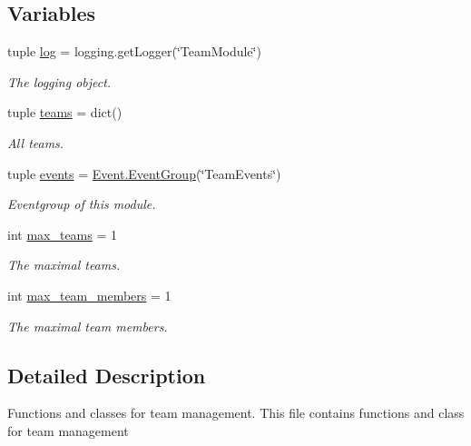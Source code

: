 \subsection*{Variables}
\begin{DoxyCompactItemize}
\item 
tuple \hyperlink{namespace_team_aeda58b8cc54d371e3187f3c9af31f8cf}{log} = logging.getLogger(\char`\"{}TeamModule\char`\"{})
\begin{DoxyCompactList}\small\item\em The logging object. \item\end{DoxyCompactList}\item 
tuple \hyperlink{namespace_team_a6e402bba79c6732149986dc7571493f2}{teams} = dict()
\begin{DoxyCompactList}\small\item\em All teams. \item\end{DoxyCompactList}\item 
tuple \hyperlink{namespace_team_abf2a7386d9dc3f37352480f92b9a4003}{events} = \hyperlink{class_event_1_1_event_group}{Event.EventGroup}(\char`\"{}TeamEvents\char`\"{})
\begin{DoxyCompactList}\small\item\em Eventgroup of this module. \item\end{DoxyCompactList}\item 
int \hyperlink{namespace_team_aea621f4ad9dbc98e75632e31f37c4ea4}{max\_\-teams} = 1
\begin{DoxyCompactList}\small\item\em The maximal teams. \item\end{DoxyCompactList}\item 
int \hyperlink{namespace_team_adf6b13168904a599042d6b67dd5e773b}{max\_\-team\_\-members} = 1
\begin{DoxyCompactList}\small\item\em The maximal team members. \item\end{DoxyCompactList}\end{DoxyCompactItemize}


\subsection{Detailed Description}
Functions and classes for team management. This file contains functions and class for team management 

